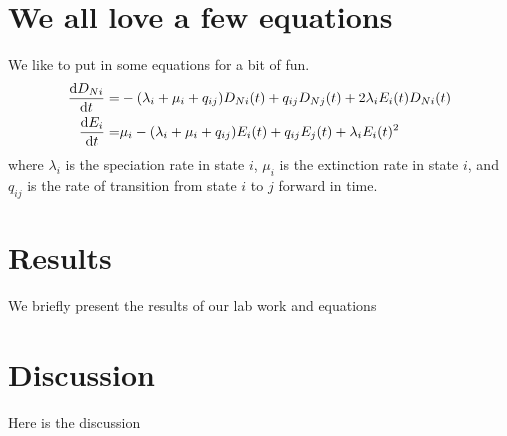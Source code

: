 \section{We all love a few equations}
We like to put in some equations for a bit of fun.
\begin{subequations}
  \label{eq:funequation1}
  \begin{align}
    \frac{\mathrm{d} D_{Ni}}{\mathrm{d} t} =& -(\lambda_i + \mu_i + q_{ij})D_{Ni}(t)
    + q_{ij}D_{Nj}(t) + 2\lambda_iE_i(t)D_{Ni}(t)
    \label{eq:funequation2}\\
    \frac{\mathrm{d} E_i}{\mathrm{d} t}
    =& \mu_i - (\lambda_i + \mu_i + q_{ij})E_i(t)
    + q_{ij}E_j(t) + \lambda_i E_i(t)^2
    \label{eq:funequation3}
  \end{align}
\end{subequations}
where $\lambda_i$ is the speciation rate in state $i$, $\mu_i$ is the
extinction rate in state $i$, and $q_{ij}$ is the rate of transition
from state $i$ to $j$ forward in time.

\section{Results}
We briefly present the results of our lab work and equations


\section{Discussion}

Here is the discussion
